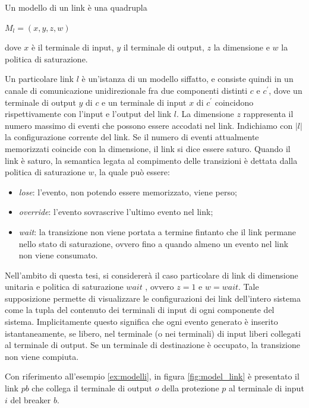 \begin{defn}
Un modello di un link è una quadrupla
\begin{center}
	$M_l = (x,y,z,w)$
\end{center}
dove $x$ è il terminale di input, $y$ il terminale di output, $z$ la dimensione e $w$ la politica di saturazione.
\end{defn}
Un particolare link $l$ è un'istanza di un modello siffatto, e consiste quindi in un canale di comunicazione unidirezionale fra due componenti distinti $c$ e $c^\prime$, dove un terminale di output $y$ di $c$ e un terminale di input $x$ di $c^\prime$ coincidono rispettivamente con l'input e l'output del link $l$.
La dimensione $z$ rappresenta il numero massimo di eventi che possono essere accodati nel link. 
Indichiamo con $|l|$ la configurazione corrente del link. 
Se il numero di eventi attualmente memorizzati coincide con la dimensione, il link si dice essere saturo.
Quando il link è saturo, la semantica legata al compimento delle transizioni è dettata dalla politica di saturazione $w$, la quale può essere:
\begin{itemize}
\item \emph{lose}: l'evento, non potendo essere memorizzato, viene perso;
\item \emph{override}: l'evento sovrascrive l'ultimo evento nel link;
\item \emph{wait}: la transizione non viene portata a termine fintanto che il link permane nello stato di saturazione, ovvero fino a quando almeno un evento nel link non viene consumato.
\label{saturation}
\end{itemize}
Nell'ambito di questa tesi, si considererà il caso particolare di link di dimensione unitaria e politica di saturazione $wait$ , ovvero $z = 1$ e $w = wait$.
Tale supposizione permette di visualizzare le configurazioni dei link dell'intero sistema come la tupla del contenuto dei terminali di input di ogni componente del sistema. Implicitamente questo significa che ogni evento generato è inserito istantaneamente, se libero, nel terminale (o nei terminali) di input liberi collegati al terminale di output. Se un terminale di destinazione è occupato, la transizione non viene compiuta.

\begin{ex}\label{ex:link}
Con riferimento all'esempio \ref{ex:modelli}, in figura \ref{fig:model_link} è presentato il link $pb$ che collega il terminale di output $o$ della protezione $p$ al terminale di input $i$ del breaker $b$.
\end{ex}

